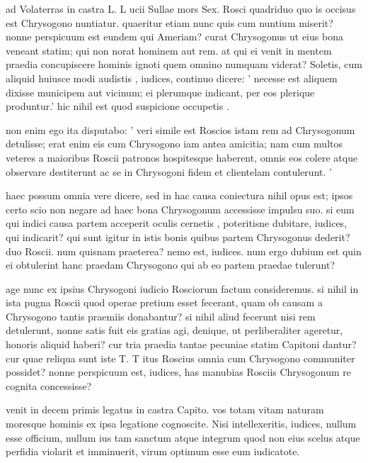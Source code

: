  ad Volaterras in castra L. L ucii Sullae mors Sex. Rosci quadriduo quo is occisus est Chrysogono nuntiatur. quaeritur etiam nunc quis cum nuntium miserit? nonne perspicuum est eundem qui Ameriam? curat Chrysogonus ut eius bona veneant statim; qui non norat hominem aut rem. at qui ei venit in mentem praedia concupiscere hominis ignoti quem omnino numquam viderat? Soletis, cum aliquid huiusce modi audistis , iudices, continuo dicere: ' necesse est aliquem dixisse municipem aut vicinum; ei plerumque indicant, per eos plerique produntur.' hic nihil est quod suspicione occupetis .

 non enim ego ita disputabo: ' veri simile est Roscios istam rem ad Chrysogonum detulisse; erat enim eis cum Chrysogono iam antea amicitia; nam cum multos veteres a maioribus Roscii patronos hospitesque haberent, omnis eos colere atque observare destiterunt ac se in Chrysogoni fidem et clientelam contulerunt. '

 haec possum omnia vere dicere, sed in hac causa coniectura nihil opus est; ipsos certo scio non negare ad haec bona Chrysogonum accessisse impulsu suo. si eum qui indici causa partem acceperit oculis cernetis , poteritisne dubitare, iudices, qui indicarit? qui sunt igitur in istis bonis quibus partem Chrysogonus dederit? duo Roscii. num quisnam praeterea? nemo est, iudices. num ergo dubium est quin ei obtulerint hanc praedam Chrysogono qui ab eo partem praedae tulerunt?

 age nunc ex ipsius Chrysogoni iudicio Rosciorum factum consideremus. si nihil in ista pugna Roscii quod operae pretium esset fecerant, quam ob causam a Chrysogono tantis praemiis donabantur? si nihil aliud fecerunt nisi rem detulerunt, nonne satis fuit eis gratias agi, denique, ut perliberaliter ageretur, honoris aliquid haberi? cur tria praedia tantae pecuniae statim Capitoni dantur? cur quae reliqua sunt iste T. T itus Roscius omnia cum Chrysogono communiter possidet? nonne perspicuum est, iudices, has manubias Rosciis Chrysogonum re cognita concessisse?

 venit in decem primis legatus in castra Capito. vos totam vitam naturam moresque hominis ex ipsa legatione cognoscite. Nisi intellexeritis, iudices, nullum esse officium, nullum ius tam sanctum atque integrum quod non eius scelus atque perfidia violarit et imminuerit, virum optimum esse eum iudicatote.


